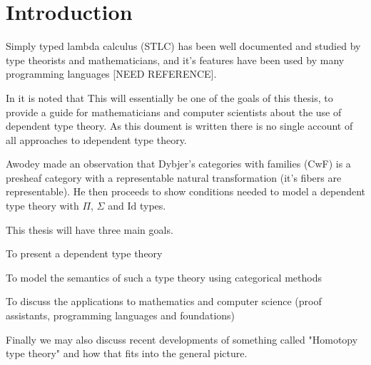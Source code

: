 \section{Introduction}

Simply typed lambda calculus (STLC) has been well documented and studied by type theorists and mathematicians, and it's features have been used by many programming languages [NEED REFERENCE].

In \cite{BarendregtHenk2013Lcwt} it is noted that  This will essentially be one of the goals of this thesis, to provide a guide for mathematicians and computer scientists about the use of dependent type theory. As this doument is written there is no single account of all approaches to \i{dependent} type theory.

Awodey \cite{2014arXiv1406.3219A} made an observation that Dybjer's \cite{dybjer1996} categories with families (CwF) is a presheaf category with a representable natural transformation (it's fibers are representable). He then proceeds to show conditions needed to model a dependent type theory with $\Pi$, $\Sigma$ and $\mathrm{Id}$ types.


This thesis will have three main goals.

\begin{enumitem}
	\item To present a dependent type theory
	\item To model the semantics of such a type theory using categorical methods
	\item To discuss the applications to mathematics and computer science (proof assistants, programming languages and foundations)
\end{enumitem}

Finally we may also discuss recent developments of something called "Homotopy type theory" and how that fits into the general picture.


